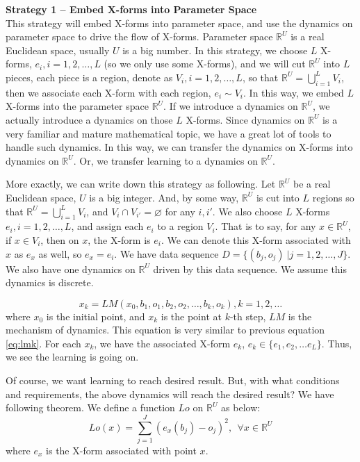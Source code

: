 {\bf Strategy 1 -- Embed X-forms into Parameter Space}\\
This strategy will embed X-forms into parameter space, and use the dynamics on parameter space to drive the flow of X-forms. Parameter space $\mathbb{R}^U$ is a real Euclidean space, usually $U$ is a big number. In this strategy, we choose $L$ X-forms, $e_i, i = 1, 2, \ldots, L$ (so we only use some X-forms), and we will cut $\mathbb{R}^U$ into $L$ pieces, each piece is a region, denote as $V_i, i = 1, 2, \ldots, L$, so that $\mathbb{R}^U = \bigcup_{i=1}^L V_i$, then we associate each X-form with each region, $e_i \sim V_i$. In this way, we embed $L$ X-forms into the parameter space  $\mathbb{R}^U$. If we introduce a dynamics on $\mathbb{R}^U$, we actually introduce a dynamics on those $L$ X-forms. Since dynamics on $\mathbb{R}^U$ is a very familiar and mature mathematical topic, we have a great lot of tools to handle such dynamics. In this way, we can transfer the dynamics on X-forms into dynamics on $\mathbb{R}^U$. Or, we transfer learning to a dynamics on $\mathbb{R}^U$.

More exactly, we can write down this strategy as following. Let $\mathbb{R}^U$ be a real Euclidean space, $U$ is a big integer. And, by some way, $\mathbb{R}^U$ is cut into $L$ regions so that $\mathbb{R}^U = \bigcup_{i=1}^L V_i$, and  $V_i \cap V_{i'} = \varnothing$ for any $i, i'$. We also choose $L$ X-forms $e_i, i = 1, 2, \ldots, L$, and assign each $e_i$ to a region $V_i$. That is to say, for any $x \in \mathbb{R}^U$,  if $x \in V_i$, then on $x$, the X-form is $e_i$. We can denote this X-form associated with $x$ as $e_x$ as well, so $e_x = e_i$.  
We have data sequence $D = \{ (b_j, o_j) \ | j = 1, 2, \ldots, J\}$.  We also have one dynamics on $\mathbb{R}^U$ driven by this data sequence. We assume this dynamics is discrete. 

\[
x_k = LM(x_0, b_1, o_1, b_2, o_2, \ldots, b_k, o_k ), k = 1, 2, \ldots  \label{eq:embk} \tag{emb}  
\]
where $x_0$ is the initial point, and $x_k$ is the point at $k$-th step, $LM$ is the mechanism of dynamics. This equation is very similar to previous equation \eqref{eq:lmk}. For each $x_k$, we have the associated X-form $e_k$, $e_k \in \{e_1, e_2, \ldots e_L\}$. Thus, we see the learning is going on. 

Of course, we want learning to reach desired result. But, with what conditions and requirements, the above dynamics will reach the desired result? We have following theorem. We define a function $Lo$ on $\mathbb{R}^U$ as below:
\[
Lo(x) = \sum_{j=1}^J ( e_x(b_j) - o_j )^2,  \ \ \forall x \in \mathbb{R}^U  
\]
where $e_x$ is the X-form associated with point $x$.


